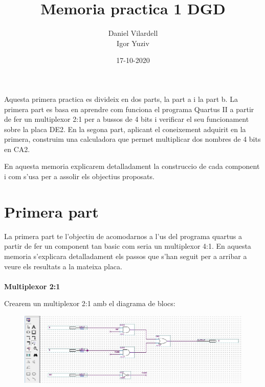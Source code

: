 \documentclass[12pt, a4papre]{article}
\author{Daniel Vilardell\\
	   Igor Yuziv}
\title{Memoria practica 1 DGD}
\date{17-10-2020}
\begin{document}
	\maketitle
	Aquesta primera practica es divideix en dos parts, la part a i la part b. La primera part es basa en aprendre com funciona el programa Quartus II a partir de fer un multiplexor  2:1 per a bussos de 4 bits i verificar el seu funcionament sobre la placa DE2. En la segona part, aplicant el coneixement adquirit en la primera, construim una calculadora que permet multiplicar dos nombres de 4 bits en CA2.
	
	En aquesta memoria explicarem detalladament la construccio de cada component i com s'usa per a assolir els objectius proposats.

	\newpage
	\section{Primera part}
	
	La primera part te l'objectiu de acomodarnos a l'us del programa quartus a partir de fer un component tan basic com seria un multiplexor 4:1. En aquesta memoria s'explicara detalladament els passos que s'han seguit per a arribar a veure els resultats a la mateixa placa.\\\\
	
	\textbf{\large{Multiplexor 2:1}}
	
	Crearem un multiplexor 2:1 amb el diagrama de blocs:
	\begin{figure}[H]
		\begin{center}
		\includegraphics[width=150mm]{multiplexor2_1.jpeg}
		\end{center}
	\end{figure}
	
\end{document}
